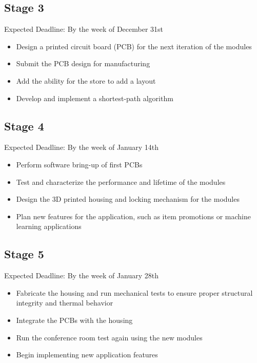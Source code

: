 \documentclass{article}
\begin{document}
\subsection{Stage 3}
Expected Deadline: By the week of December 31st \\
\begin{itemize}
\item Design a printed circuit board (PCB) for the next iteration of the modules
\item Submit the PCB design for manufacturing
\item Add the ability for the store to add a layout
\item Develop and implement a shortest-path algorithm
\end{itemize}

\subsection{Stage 4}
Expected Deadline: By the week of January 14th \\
\begin{itemize}
\item Perform software bring-up of first PCBs
\item Test and characterize the performance and lifetime of the modules
\item Design the 3D printed housing and locking mechanism for the modules
\item Plan new features for the application, such as item promotions or machine learning applications
\end{itemize}

\subsection{Stage 5}
Expected Deadline: By the week of January 28th \\
\begin{itemize}
\item Fabricate the housing and run mechanical tests to ensure proper structural integrity and thermal behavior
\item Integrate the PCBs with the housing
\item Run the conference room test again using the new modules
\item Begin implementing new application features
\end{itemize}
\end{document}
